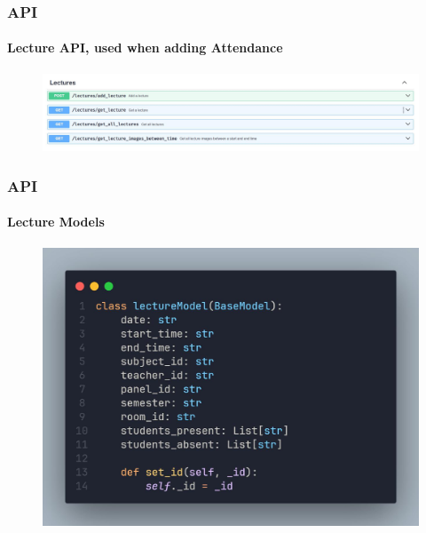 \documentclass[aspectratio=169]{beamer}
\begin{document}
\begin{frame}
	\centering
	\frametitle{API}
	\framesubtitle{Lecture API, used when adding Attendance}
	\begin{minipage}{0.95\textwidth}
		\begin{figure}[H]
			\centering
			\includegraphics[width=.95\textwidth]{swagger 8.jpg}
		\end{figure}
	\end{minipage}
\end{frame}
\begin{frame}
	\centering
	\frametitle{API}
	\framesubtitle{Lecture Models}
	\begin{minipage}{0.95\textwidth}
		\begin{figure}[H]
			\centering
			\includegraphics[width=.65\textwidth]{lecture.jpg}
		\end{figure}
	\end{minipage}
\end{frame}
\end{document}
